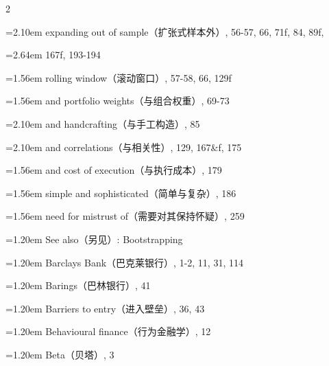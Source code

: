 {\begin{multicols}{2}
\par \noindent\hangindent=2.10em\hspace*{0.90em} expanding out of sample（扩张式样本外）, 56-57, 66, 71f, 84, 89f,
\par \noindent\hangindent=2.64em\hspace*{1.44em} 167f, 193-194
\par \noindent\hangindent=1.56em\hspace*{0.36em} rolling window（滚动窗口）, 57-58, 66, 129f
\par \noindent\hangindent=1.56em\hspace*{0.36em} and portfolio weights（与组合权重）, 69-73
\par \noindent\hangindent=2.10em\hspace*{0.90em} and handcrafting（与手工构造）, 85
\par \noindent\hangindent=2.10em\hspace*{0.90em} and correlations（与相关性）, 129, 167\&f, 175
\par \noindent\hangindent=1.56em\hspace*{0.36em} and cost of execution（与执行成本）, 179
\par \noindent\hangindent=1.56em\hspace*{0.36em} simple and sophisticated（简单与复杂）, 186
\par \noindent\hangindent=1.56em\hspace*{0.36em} need for mistrust of（需要对其保持怀疑）, 259
\par \noindent\hangindent=1.20em\hspace*{0.00em} See also（另见）: Bootstrapping
\par \noindent\hangindent=1.20em\hspace*{0.00em} Barclays Bank（巴克莱银行）, 1-2, 11, 31, 114
\par \noindent\hangindent=1.20em\hspace*{0.00em} Barings（巴林银行）, 41
\par \noindent\hangindent=1.20em\hspace*{0.00em} Barriers to entry（进入壁垒）, 36, 43
\par \noindent\hangindent=1.20em\hspace*{0.00em} Behavioural finance（行为金融学）, 12
\par \noindent\hangindent=1.20em\hspace*{0.00em} Beta（贝塔）, 3

\end{multicols}}
